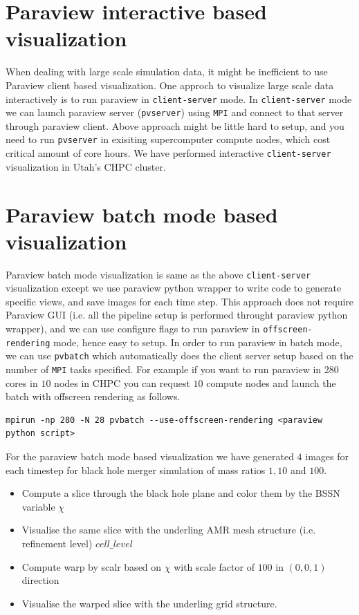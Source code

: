 \section{Paraview interactive based visualization}
When dealing with large scale simulation data, it might be inefficient to use Paraview client based visualization. One approch to visualize large scale data interactively is to run paraview in \texttt{client-server} mode. 
In \texttt{client-server} mode we can launch paraview server (\texttt{pvserver}) using \texttt{MPI} and connect to that server through paraview client. Above approach might be little hard to setup, and you need to run \texttt{pvserver} in 
exisiting supercomputer compute nodes, which cost critical amount of core hours. We have performed interactive \texttt{client-server} visualization in Utah's CHPC cluster. 

\section{Paraview batch mode based visualization}
Paraview batch mode visualization is same as the above \texttt{client-server} visualization except we use paraview python wrapper to write code to generate specific views, and save images for each time step. This approach does not require 
Paraview GUI (i.e. all the pipeline setup is performed throught paraview python wrapper), and we can use configure flags to run paraview in \texttt{offscreen-rendering} mode, hence easy to setup. In order to run paraview in batch mode, 
we can use \texttt{pvbatch} which automatically does the client server setup based on the number of \texttt{MPI} tasks specified. For example if you want to run paraview in $280$ cores in $10$ nodes in CHPC you can request $10$
compute nodes and launch the batch with offscreen rendering as follows. 

\begin{lstlisting}[basicstyle=\small]
mpirun -np 280 -N 28 pvbatch --use-offscreen-rendering <paraview python script>
\end{lstlisting}

For the paraview batch mode based visualization we have generated $4$ images for each timestep for black hole merger simulation of mass ratios $1,10$ and $100$. 
\begin{itemize}
    \item Compute a slice through the black hole plane and color them by the BSSN variable $\chi$
    \item Visualise the same slice with the underling AMR mesh structure (i.e. refinement level) $cell\_level$    
    \item Compute warp by scalr based on $\chi$ with scale factor of $100$ in $(0,0,1)$ direction
    \item Visualise the warped slice with the underling grid structure. 
\end{itemize}

